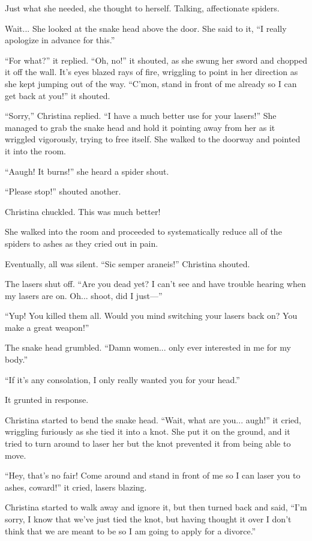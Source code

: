 \documentclass[showtrims,b6paper,draft,10pt]{memoir}
\begin{document}
Just what she needed, she thought to herself.  Talking, affectionate spiders.

Wait... She looked at the snake head above the door.  She said to it,  ``I really apologize in advance for this.''

``For what?'' it replied. ``Oh, no!'' it shouted, as she swung her sword and chopped it off the wall.  It's eyes blazed rays of fire, wriggling to point in her direction as she kept jumping out of the way.  ``C'mon, stand in front of me already so I can get back at you!'' it shouted.

``Sorry,'' Christina replied.  ``I have a much better use for your lasers!''  She managed to grab the snake head and hold it pointing away from her as it wriggled vigorously, trying to free itself.  She walked to the doorway and pointed it into the room.

``Aaugh!  It burns!'' she heard a spider shout.

``Please stop!'' shouted another.

Christina chuckled.  This was much better!

She walked into the room and proceeded to systematically reduce all of the spiders to ashes as they cried out in pain.

Eventually, all was silent.  ``Sic semper araneis!'' Christina shouted.

The lasers shut off.  ``Are you dead yet?  I can't see and have trouble hearing when my lasers are on.  Oh... shoot, did I just---''

``Yup!  You killed them all.  Would you mind switching your lasers back on?  You make a great weapon!''

The snake head grumbled.  ``Damn women... only ever interested in me for my body.''

``If it's any consolation, I only really wanted you for your head.''

It grunted in response.

Christina started to bend the snake head.  ``Wait, what are you... augh!'' it cried, wriggling furiously as she tied it into a knot.  She put it on the ground, and it tried to turn around to laser her but the knot prevented it from being able to move.

``Hey, that's no fair!  Come around and stand in front of me so I can laser you to ashes, coward!'' it cried, lasers blazing.

Christina started to walk away and ignore it, but then turned back and said,  ``I'm sorry, I know that we've just tied the knot, but having thought it over I don't think that we are meant to be so I am going to apply for a divorce.''
\end{document}
